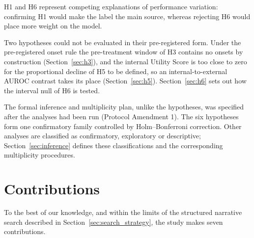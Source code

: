 H1 and H6 represent competing explanations of performance variation:
confirming H1 would make the label the main source, whereas rejecting H6 would
place more weight on the model.

Two hypotheses could not be evaluated in their pre-registered form. Under the
pre-registered onset rule the pre-treatment window of H3 contains no onsets by
construction (Section~\ref{sec:h3}), and the internal Utility Score is too
close to zero for the proportional decline of H5 to be defined, so an
internal-to-external AUROC contrast takes its place (Section~\ref{sec:h5}).
Section~\ref{sec:h6} sets out how the interval null of H6 is tested.

The formal inference and multiplicity plan, unlike the hypotheses, was
specified after the analyses had been run (Protocol Amendment 1). The six
hypotheses form one
confirmatory family controlled by Holm--Bonferroni correction. Other analyses
are classified as confirmatory, exploratory or descriptive;
Section~\ref{sec:inference} defines these classifications and the
corresponding multiplicity procedures.


\section{Contributions}
\label{sec:contrib}

To the best of our knowledge, and within the limits of the structured narrative
search described in Section~\ref{sec:search_strategy}, the study makes seven
contributions.

